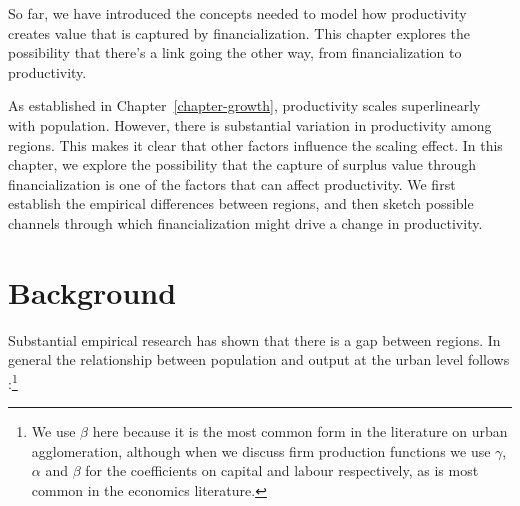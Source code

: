 






So far, we have introduced the concepts needed to model %
how productivity creates value that is captured by financialization. %
This chapter explores the possibility that there's a link going the other way, from financialization to productivity. 

As established in Chapter~\ref{chapter-growth}, productivity scales superlinearly with population. %
However, there is substantial variation in productivity among regions.  This makes it clear that other factors influence the scaling effect. In this chapter, we explore the possibility that the capture of surplus value through financialization is one of the factors that can affect  productivity. We first establish the empirical differences between regions, and then sketch possible channels through which financialization might drive a change in productivity. 


\section{Background}

Substantial empirical research has shown that there is a gap between regions. In general the relationship between population and output at the urban level follows \cite{loboUrbanScalingProduction2013}:\footnote{We use $\beta$ here because it is the most common form in the literature on urban agglomeration, although when we discuss firm production functions we use $\gamma$, $\alpha$ and $\beta$ for the coefficients on capital and labour respectively, as is most common in the economics literature.}

